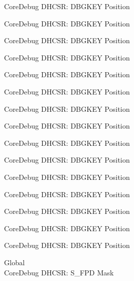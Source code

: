 \begin{DoxyRefList}
\label{deprecated__deprecated000105}%
%
Core\+Debug DHCSR\+: DBGKEY Position 

\label{deprecated__deprecated000159}%
%
Core\+Debug DHCSR\+: DBGKEY Position 

\label{deprecated__deprecated000244}%
%
Core\+Debug DHCSR\+: DBGKEY Position 

\label{deprecated__deprecated000301}%
%
Core\+Debug DHCSR\+: DBGKEY Position 

\label{deprecated__deprecated000377}%
%
Core\+Debug DHCSR\+: DBGKEY Position 

\label{deprecated__deprecated000456}%
%
Core\+Debug DHCSR\+: DBGKEY Position 

\label{deprecated__deprecated000558}%
%
Core\+Debug DHCSR\+: DBGKEY Position 

\label{deprecated__deprecated000683}%
%
Core\+Debug DHCSR\+: DBGKEY Position 

\label{deprecated__deprecated000783}%
%
Core\+Debug DHCSR\+: DBGKEY Position 

\label{deprecated__deprecated000837}%
%
Core\+Debug DHCSR\+: DBGKEY Position 

\label{deprecated__deprecated000922}%
%
Core\+Debug DHCSR\+: DBGKEY Position 

\label{deprecated__deprecated000979}%
%
Core\+Debug DHCSR\+: DBGKEY Position 

\label{deprecated__deprecated001055}%
%
Core\+Debug DHCSR\+: DBGKEY Position 

\label{deprecated__deprecated001134}%
%
Core\+Debug DHCSR\+: DBGKEY Position 

\label{deprecated__deprecated001236}%
%
Core\+Debug DHCSR\+: DBGKEY Position  
\item[Global \doxylink{group___c_m_s_i_s___s_c_b_gae37ad624177fe2d3298fd32d528805aa}{Core\+Debug\+\_\+\+DHCSR\+\_\+\+S\+\_\+\+FPD\+\_\+\+Msk} ]\hfill \\
\label{deprecated__deprecated000014}%
%
Core\+Debug DHCSR\+: S\+\_\+\+FPD Mask 


\end{DoxyRefList}
